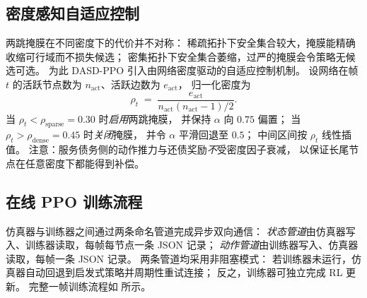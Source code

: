 \subsection{密度感知自适应控制}
\label{subsec:density}

两跳掩膜在不同密度下的代价并不对称：
稀疏拓扑下安全集合较大，掩膜能精确收缩可行域而不损失候选；
密集拓扑下安全集合萎缩，过严的掩膜会令策略无候选可选。
为此 DASD-PPO 引入由网络密度驱动的自适应控制机制。
设网络在帧 \(t\) 的活跃节点数为 \(n_{\mathrm{act}}\)、活跃边数为 \(e_{\mathrm{act}}\)，
归一化密度为
\begin{equation}
\rho_t \;=\; \frac{e_{\mathrm{act}}}{n_{\mathrm{act}}(n_{\mathrm{act}}-1)/2}.
\label{eq:density}
\end{equation}
当 \(\rho_t<\rho_{\mathrm{sparse}}=0.30\) 时\emph{启用}两跳掩膜，
并保持 \(\alpha\) 向 \(0.75\) 偏置；
当 \(\rho_t>\rho_{\mathrm{dense}}=0.45\) 时\emph{关闭}掩膜，
并令 \(\alpha\) 平滑回退至 \(0.5\)；
中间区间按 \(\rho_t\) 线性插值。
注意：服务债务侧的动作推力与还债奖励\emph{不}受密度因子衰减，
以保证长尾节点在任意密度下都能得到补偿。

\subsection{在线 PPO 训练流程}
\label{subsec:training}

仿真器与训练器之间通过两条命名管道完成异步双向通信：
\emph{状态管道}由仿真器写入、训练器读取，每帧每节点一条 JSON 记录；
\emph{动作管道}由训练器写入、仿真器读取，每帧一条 JSON 记录。
两条管道均采用非阻塞模式：
若训练器未运行，仿真器自动回退到启发式策略并周期性重试连接；
反之，训练器可独立完成 RL 更新。
完整一帧训练流程如  所示。


